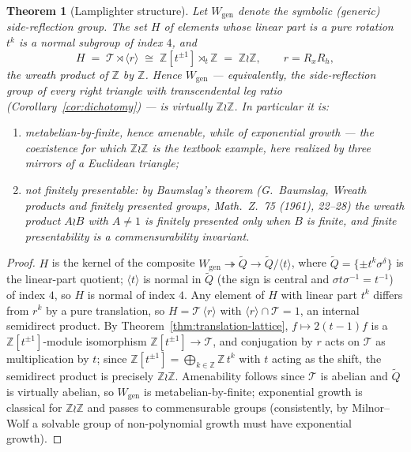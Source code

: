 \documentclass[11pt,a4paper]{article}
\newtheorem{theorem}{Theorem}
\theoremstyle{remark}
\theoremstyle{plain}
\begin{document}
\begin{theorem}[Lamplighter structure]
\label{thm:lamplighter}
Let $W_{\mathrm{gen}}$ denote the symbolic (generic) side-reflection
group.  The set $H$ of elements whose linear part is a pure rotation
$t^k$ is a normal subgroup of index $4$, and
\[
H \;=\; \mathcal{T} \rtimes \langle r \rangle
\;\cong\; \mathbb{Z}[t^{\pm 1}] \rtimes_t \mathbb{Z}
\;=\; \mathbb{Z} \wr \mathbb{Z},
\qquad r = R_x R_h,
\]
the wreath product of $\mathbb{Z}$ by $\mathbb{Z}$.  Hence
$W_{\mathrm{gen}}$ --- equivalently, the side-reflection group of
\emph{every} right triangle with transcendental leg ratio
(Corollary~\ref{cor:dichotomy}) --- is virtually
$\mathbb{Z} \wr \mathbb{Z}$.  In particular it is:
\begin{enumerate}[label=(\roman*),itemsep=0.1em]
\item metabelian-by-finite, hence \emph{amenable}, while of
exponential growth --- the coexistence for which
$\mathbb{Z} \wr \mathbb{Z}$ is the textbook example, here realized by
three mirrors of a Euclidean triangle;
\item \emph{not finitely presentable}: by Baumslag's theorem
(G.~Baumslag, \emph{Wreath products and finitely presented groups},
Math.\ Z.\ 75 (1961), 22--28) the wreath product $A \wr B$ with
$A \neq 1$ is finitely presented only when $B$ is finite, and finite
presentability is a commensurability invariant.
\end{enumerate}
\end{theorem}

\begin{proof}
$H$ is the kernel of the composite
$W_{\mathrm{gen}} \twoheadrightarrow \widetilde Q \to
\widetilde Q / \langle t \rangle$, where
$\widetilde Q = \{\pm t^k \sigma^\delta\}$ is the linear-part
quotient; $\langle t \rangle$ is normal in $\widetilde Q$ (the sign
is central and $\sigma t \sigma^{-1} = t^{-1}$) of index $4$, so $H$
is normal of index $4$.  Any element of $H$ with linear part $t^k$
differs from $r^k$ by a pure translation, so
$H = \mathcal{T}\,\langle r \rangle$ with
$\langle r \rangle \cap \mathcal{T} = 1$, an internal semidirect
product.  By Theorem~\ref{thm:translation-lattice},
$f \mapsto 2(t-1)f$ is a $\mathbb{Z}[t^{\pm 1}]$-module isomorphism
$\mathbb{Z}[t^{\pm 1}] \to \mathcal{T}$, and conjugation by $r$ acts
on $\mathcal{T}$ as multiplication by $t$; since
$\mathbb{Z}[t^{\pm 1}] = \bigoplus_{k \in \mathbb{Z}}
\mathbb{Z}\,t^k$ with $t$ acting as the shift, the semidirect product
is precisely $\mathbb{Z} \wr \mathbb{Z}$.  Amenability follows since
$\mathcal{T}$ is abelian and $\widetilde Q$ is virtually abelian, so
$W_{\mathrm{gen}}$ is metabelian-by-finite; exponential growth is
classical for $\mathbb{Z} \wr \mathbb{Z}$ and passes to
commensurable groups (consistently, by Milnor--Wolf a solvable group
of non-polynomial growth must have exponential growth).
\end{proof}
\end{document}
